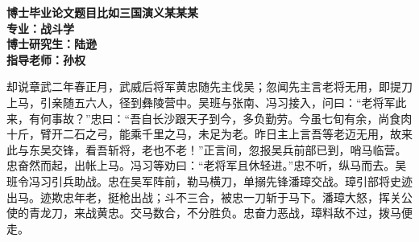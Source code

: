 \documentclass[UTF8,12pt,twoside,a4paper]{ctexart} %
\begin{document}





\setcounter{page}{1}%






\begin{titlepage}

		
		\begin{center}
			\bfseries 
博士毕业论文题目比如三国演义某某某
\\%
			\vspace*{36pt}%
			\heiti
				{专\quad \quad 业：\quad 战斗学}\\
				{博士研究生：\quad 陆逊}\\
				{指导老师：\quad 孙权}\\
		 \vspace*{36pt}
		\heiti{\zihao{-2}{中文摘要}}
				
				\vspace*{16pt}
		\end{center}
		
						\songti
却说章武二年春正月，武威后将军黄忠随先主伐吴；忽闻先主言老将无用，即提刀上马，引亲随五六人，径到彝陵营中。吴班与张南、冯习接入，问曰：“老将军此来，有何事故？”忠曰：“吾自长沙跟天子到今，多负勤劳。今虽七旬有余，尚食肉十斤，臂开二石之弓，能乘千里之马，未足为老。昨日主上言吾等老迈无用，故来此与东吴交锋，看吾斩将，老也不老！”正言间，忽报吴兵前部已到，哨马临营。忠奋然而起，出帐上马。冯习等劝曰：“老将军且休轻进。”忠不听，纵马而去。吴班令冯习引兵助战。忠在吴军阵前，勒马横刀，单搦先锋潘璋交战。璋引部将史迹出马。迹欺忠年老，挺枪出战；斗不三合，被忠一刀斩于马下。潘璋大怒，挥关公使的青龙刀，来战黄忠。交马数合，不分胜负。忠奋力恶战，璋料敌不过，拨马便走。


\end{titlepage}
\end{document}
